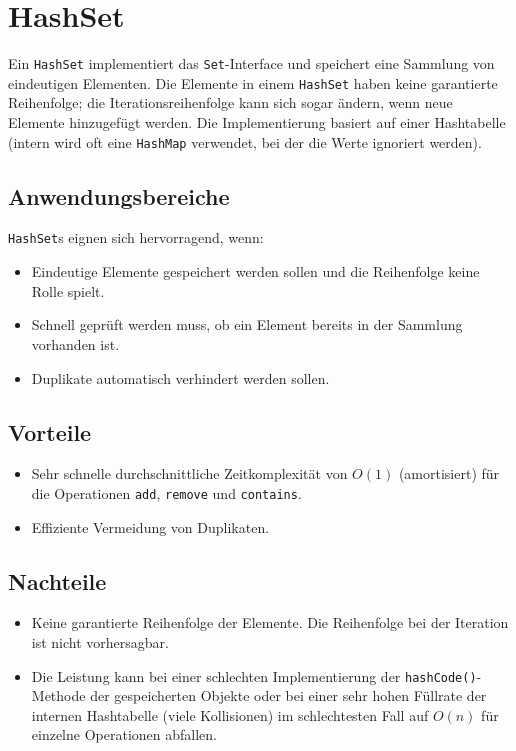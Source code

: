 \section{HashSet}
Ein \texttt{HashSet} implementiert das \texttt{Set}-Interface und speichert
eine Sammlung von eindeutigen Elementen. Die Elemente in einem \texttt{HashSet}
haben keine garantierte Reihenfolge; die Iterationsreihenfolge kann sich sogar
ändern, wenn neue Elemente hinzugefügt werden. Die Implementierung basiert auf
einer Hashtabelle (intern wird oft eine \texttt{HashMap} verwendet, bei der die
Werte ignoriert werden).

\subsection{Anwendungsbereiche}
\texttt{HashSet}s eignen sich hervorragend, wenn:
\begin{itemize}
    \item Eindeutige Elemente gespeichert werden sollen und die Reihenfolge keine Rolle
          spielt.
    \item Schnell geprüft werden muss, ob ein Element bereits in der Sammlung vorhanden
          ist.
    \item Duplikate automatisch verhindert werden sollen.
\end{itemize}

\subsection{Vorteile}
\begin{itemize}
    \item Sehr schnelle durchschnittliche Zeitkomplexität von $O(1)$ (amortisiert) für
          die Operationen \texttt{add}, \texttt{remove} und \texttt{contains}.
    \item Effiziente Vermeidung von Duplikaten.
\end{itemize}

\subsection{Nachteile}
\begin{itemize}
    \item Keine garantierte Reihenfolge der Elemente. Die Reihenfolge bei der Iteration
          ist nicht vorhersagbar.
    \item Die Leistung kann bei einer schlechten Implementierung der
          \texttt{hashCode()}-Methode der gespeicherten Objekte oder bei einer sehr hohen
          Füllrate der internen Hashtabelle (viele Kollisionen) im schlechtesten Fall auf
          $O(n)$ für einzelne Operationen abfallen.
\end{itemize}

